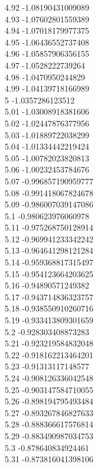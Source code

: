{4.92	-1.08190431009089\\
4.93	-1.07602801559389\\
4.94	-1.07018179977375\\
4.95	-1.06436552737408\\
4.96	-1.05857906356155\\
4.97	-1.0528222739264\\
4.98	-1.0470950244829\\
4.99	-1.04139718166989\\
5	-1.0357286123512\\
5.01	-1.03008918381606\\
5.02	-1.02447876377956\\
5.03	-1.01889722038299\\
5.04	-1.01334442219424\\
5.05	-1.00782023820813\\
5.06	-1.00232453784676\\
5.07	-0.996857190959777\\
5.08	-0.991418067824678\\
5.09	-0.986007039147086\\
5.1	-0.980623976060978\\
5.11	-0.975268750128914\\
5.12	-0.969941233342242\\
5.13	-0.964641298121284\\
5.14	-0.959368817315497\\
5.15	-0.954123664203625\\
5.16	-0.94890571249382\\
5.17	-0.943714836323757\\
5.18	-0.938550910260716\\
5.19	-0.933413809301659\\
5.2	-0.928303408873283\\
5.21	-0.923219584832048\\
5.22	-0.918162213464201\\
5.23	-0.91313117148577\\
5.24	-0.908126336042548\\
5.25	-0.903147584710055\\
5.26	-0.898194795493484\\
5.27	-0.893267846827633\\
5.28	-0.888366617576814\\
5.29	-0.883490987034753\\
5.3	-0.878640834924461\\
5.31	-0.873816041398106\\
}
